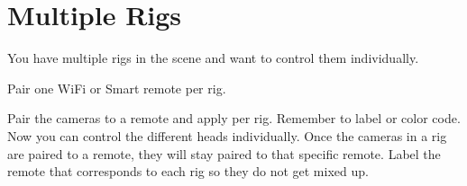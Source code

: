 \chapter{Multiple Rigs}
\pagecolor{white}
\label{chap:10}
\begin{fullwidth}


\problem

{\large You have multiple rigs in the scene and want to control them individually. \par}

\solution

{\large Pair one WiFi or Smart remote per rig. \par}


Pair the cameras to a remote and apply per rig. Remember to label or color code. Now you can control the different heads individually. Once the cameras in a rig are paired to a remote, they will stay paired to that specific remote. Label the remote that corresponds to each rig so they do not get mixed up. 





\clearpage
\end{fullwidth}
